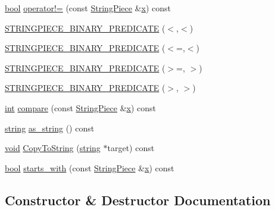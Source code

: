 \begin{DoxyCompactItemize}
\item 
\hyperlink{aplibtool_8c_ad5c9d4ba3dc37783a528b0925dc981a0}{bool} \hyperlink{classpcrecpp_1_1StringPiece_ab6821a18f607ebd5ea083618091ef245}{operator!=} (const \hyperlink{classpcrecpp_1_1StringPiece}{String\+Piece} \&\hyperlink{pcregrep_8txt_a4242e9148f20c002763bf4ba53b26ad6}{x}) const 
\item 
\hyperlink{classpcrecpp_1_1StringPiece_a1597d52b35a7b91dd38449c47f80e4b2}{S\+T\+R\+I\+N\+G\+P\+I\+E\+C\+E\+\_\+\+B\+I\+N\+A\+R\+Y\+\_\+\+P\+R\+E\+D\+I\+C\+A\+TE} ($<$,$<$)
\item 
\hyperlink{classpcrecpp_1_1StringPiece_aeb12f0327e5393668cf5209795cf792a}{S\+T\+R\+I\+N\+G\+P\+I\+E\+C\+E\+\_\+\+B\+I\+N\+A\+R\+Y\+\_\+\+P\+R\+E\+D\+I\+C\+A\+TE} ($<$=,$<$)
\item 
\hyperlink{classpcrecpp_1_1StringPiece_a126a9c993d441badb7bf543966a2b742}{S\+T\+R\+I\+N\+G\+P\+I\+E\+C\+E\+\_\+\+B\+I\+N\+A\+R\+Y\+\_\+\+P\+R\+E\+D\+I\+C\+A\+TE} ($>$=, $>$)
\item 
\hyperlink{classpcrecpp_1_1StringPiece_a39d7d076720f706ca4d0381cdf67cdb1}{S\+T\+R\+I\+N\+G\+P\+I\+E\+C\+E\+\_\+\+B\+I\+N\+A\+R\+Y\+\_\+\+P\+R\+E\+D\+I\+C\+A\+TE} ($>$, $>$)
\item 
\hyperlink{pcre_8txt_a42dfa4ff673c82d8efe7144098fbc198}{int} \hyperlink{classpcrecpp_1_1StringPiece_a354899ca3b352862d12909a68d679042}{compare} (const \hyperlink{classpcrecpp_1_1StringPiece}{String\+Piece} \&\hyperlink{pcregrep_8txt_a4242e9148f20c002763bf4ba53b26ad6}{x}) const 
\item 
\hyperlink{pcre_8txt_ad52baeed02a03dda73cbe504945c9c35}{string} \hyperlink{classpcrecpp_1_1StringPiece_af76eb55a24ef19d8fc99813e3ee40d65}{as\+\_\+string} () const 
\item 
\hyperlink{group__MOD__ISAPI_gacd6cdbf73df3d9eed42fa493d9b621a6}{void} \hyperlink{classpcrecpp_1_1StringPiece_a710ac549e357eb67f51612e8fdd0943e}{Copy\+To\+String} (\hyperlink{pcre_8txt_ad52baeed02a03dda73cbe504945c9c35}{string} $\ast$target) const 
\item 
\hyperlink{aplibtool_8c_ad5c9d4ba3dc37783a528b0925dc981a0}{bool} \hyperlink{classpcrecpp_1_1StringPiece_a1b27d8fd2767241977d9cf2acaacd290}{starts\+\_\+with} (const \hyperlink{classpcrecpp_1_1StringPiece}{String\+Piece} \&\hyperlink{pcregrep_8txt_a4242e9148f20c002763bf4ba53b26ad6}{x}) const 
\end{DoxyCompactItemize}


\subsection{Constructor \& Destructor Documentation}
